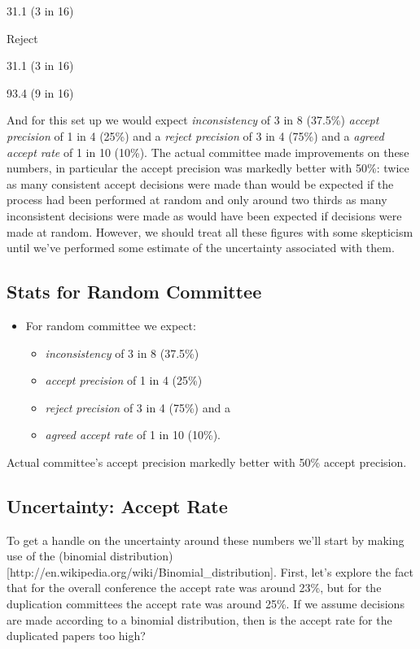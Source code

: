31.1 (3 in 16)

Reject

31.1 (3 in 16)

93.4 (9 in 16)

And for this set up we would expect \emph{inconsistency} of 3 in 8
(37.5\%) \emph{accept precision} of 1 in 4 (25\%) and a \emph{reject
precision} of 3 in 4 (75\%) and a \emph{agreed accept rate} of 1 in 10
(10\%). The actual committee made improvements on these numbers, in
particular the accept precision was markedly better with 50\%: twice as
many consistent accept decisions were made than would be expected if the
process had been performed at random and only around two thirds as many
inconsistent decisions were made as would have been expected if
decisions were made at random. However, we should treat all these
figures with some skepticism until we've performed some estimate of the
uncertainty associated with them.

\hypertarget{stats-for-random-committee}{%
\subsection{Stats for Random
Committee}\label{stats-for-random-committee}}

\begin{itemize}
\tightlist
\item
  For random committee we expect:

  \begin{itemize}
  \tightlist
  \item
    \emph{inconsistency} of 3 in 8 (37.5\%)
  \item
    \emph{accept precision} of 1 in 4 (25\%)
  \item
    \emph{reject precision} of 3 in 4 (75\%) and a
  \item
    \emph{agreed accept rate} of 1 in 10 (10\%).
  \end{itemize}
\end{itemize}

Actual committee's accept precision markedly better with 50\% accept
precision.

\hypertarget{uncertainty-accept-rate}{%
\subsection{Uncertainty: Accept Rate}\label{uncertainty-accept-rate}}

To get a handle on the uncertainty around these numbers we'll start by
making use of the (binomial
distribution){[}http://en.wikipedia.org/wiki/Binomial\_distribution{]}.
First, let's explore the fact that for the overall conference the accept
rate was around 23\%, but for the duplication committees the accept rate
was around 25\%. If we assume decisions are made according to a binomial
distribution, then is the accept rate for the duplicated papers too
high?

